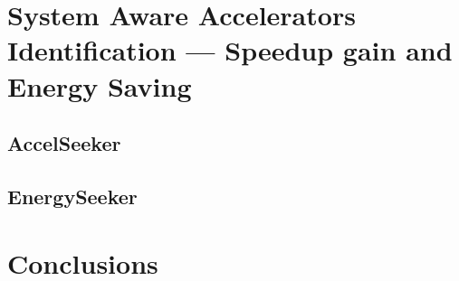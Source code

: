 \documentclass[]{usiinfthesis}
\newcommand{\aseeker}{{AccelSeeker}}
\begin{document}
%
%
%
%
%  
%
%
%
%
%


\chapter[System Aware Accelerators Identification]
{System Aware Accelerators Identification --- Speedup gain and Energy Saving}

\section{\aseeker}

\section{EnergySeeker}

\chapter*{Conclusions}


\backmatter


%

%
%


%
%
%
\end{document}
